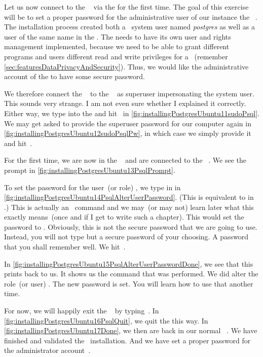 Let us now connect to the \postgresql\  via the  for the first time.
The goal of this exercise will be to set a proper password for the administrative user of our instance the \postgresql\ .
The installation process created both a \linux\ system user named \textit{postgres} as well as a user of the same name in the .
The  needs to have its own user and rights management implemented, because we need to be able to grant different programs and users different read and write privileges for a ~(remember \cref{sec:featuresDataPrivacyAndSecurity}).
Thus, we would like the administrative account  of the  to have some secure password.

We therefore connect the \psql\  to the \postgresql\  as superuser impersonating the  system user.
This sounds very strange.
I am not even sure whether I explained it correctly.
Either way, we type  into the  and hit~\keys{\return} in \cref{fig:installingPostgresUbuntu11sudoPsql}.
We may get asked to provide the superuser password for our computer again in \cref{fig:installingPostgresUbuntu12sudoPsqlPw}, in which case we simply provide it and hit~\keys{\return}.

For the first time, we are now in the \psql\  and are connected to the \postgresql\ .
We see the prompt \expandafter{} in \cref{fig:installingPostgresUbuntu13PsqlPrompt}.%
%
\begin{sloppypar}%
To set the password for the user~(or role) , we type in  in \cref{fig:installingPostgresUbuntu14PsqlAlterUserPassword}.
(This is equivalent to  in \postgresql.)
This is actually an \sql\ command and we may~(or may not) learn later what this exactly means~(once and if I get to write such a chapter).
This would set the password to .
Obviously, this is not the secure password that we are going to use.
Instead, you will not type  but a secure password of your choosing.
A password that you shall remember well.
We hit~\keys{\return}.%
\end{sloppypar}%
%
In \cref{fig:installingPostgresUbuntu15PsqlAlterUserPasswordDone}, we see that this prints  back to us.
It shows us the command that was performed.
We did alter the role~(or user) .
The new password is set.
You will learn how to use that another time.

For now, we will happily exit the \psql\  by typing~.
In \cref{fig:installingPostgresUbuntu16PsqlQuit}, we quit the  this way.
In \cref{fig:installingPostgresUbuntu17Done}, we then are back in our normal \bash\ .
We have finished and validated the \postgresql\ installation.
And we have set a proper password for the administrator account~.%
%
\FloatBarrier%
\endhsection%
%
